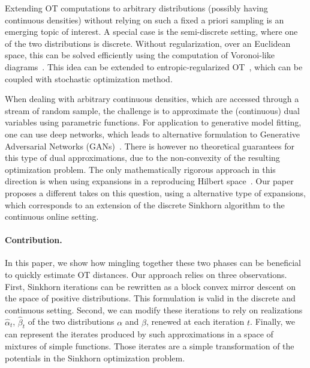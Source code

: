 Extending OT computations to arbitrary distributions (possibly having continuous densities) without relying on such a fixed a priori sampling is an emerging topic of interest. A special case is the semi-discrete setting, where one of the two distributions is discrete. Without regularization, over an Euclidean space, this can be solved efficiently using the computation of Voronoi-like diagrams~\cite{}. This idea can be extended to entropic-regularized OT~\cite{}, which can be coupled with stochastic optimization method. 

When dealing with arbitrary continuous densities, which are accessed through a stream of random sample, the challenge is to approximate  the (continuous) dual variables using parametric functions. For application to generative model fitting, one can use deep networks, which leads to alternative formulation to Generative Adversarial Networks (GANs)~\cite{}. 
%
%
There is however no theoretical guarantees for this type of dual approximations, due to the non-convexity of the resulting optimization problem. The only mathematically rigorous approach in this direction is when using expansions in a reproducing Hilbert space~\cite{}. Our paper proposes a different takes on this question, using a alternative type of expansions, which corresponds to an extension of the discrete Sinkhorn algorithm to the continuous online setting.




\paragraph{Contribution.}

In this paper, we show how mingling together these two phases can be beneficial
to quickly estimate OT distances.  Our approach relies on three observations. First,
Sinkhorn iterations can be rewritten as a block convex mirror descent on the
space of positive distributions. This formulation is valid in the discrete and
continuous setting. Second, we can modify these iterations to rely on
realizations $\hat \alpha_t$, $\hat \beta_t$ of the two distributions $\alpha$
and $\beta$, renewed at each iteration $t$. Finally, we can represent the
iterates produced by such approximations in a space of mixtures of simple
functions. Those iterates are a simple transformation of the potentials in the
Sinkhorn optimization problem.

